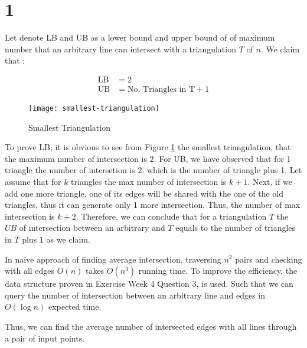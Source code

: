 
\section*{1}

Let denote LB and UB as a lower bound and upper bound of
of maximum number that an arbitrary line can intersect with a
triangulation $T$ of $n$. We claim that :

\begin{align*}
    \mathrm{LB} &= 2\\
    \mathrm{UB} &= \text{No. Triangles in T} + 1
\end{align*}
\begin{figure}[h]
    \begin{center}
        \texttt{[image: smallest-triangulation]}
        \caption{Smallest Triangulation}
        \label{fig:smallest-triangulation}
    \end{center}
\end{figure}

To prove LB, it is obvious to see from Figure \ref{fig:smallest-triangulation}
the smallest triangulation, that the maximum number of intersection is $2$.
For UB, we have observed that for 1 triangle the number of intersetion is $2$.
which is the number of triangle plus 1. Let assume that for $k$ triangles
the max number of intersection is $k+1$. Next, if we add one more triangle,
one of its edges will be shared with the one of the old triangles, thus
it can generate only 1 more intersection. Thus, the number of max intersection
is $k+2$. Therefore, we can conclude that for a triangulation $T$ the $UB$ of
intersection between an arbitrary and $T$ equals to the number of triangles
in $T$ plus $1$ as we claim.

In naive approach of finding average intersection, traversing $n^2$ pairs and checking with all edges $O(n)$
takes $O(n^3)$ running time. To improve the efficiency, the data structure proven in Exercise Week 4 Question 3,
is used. Such that we can query the number of intersection between an arbitrary line and
edges in $O(\log{n})$ expected time.

Thus, we can find the average number of intersected edges with all lines through
a pair of input points.
